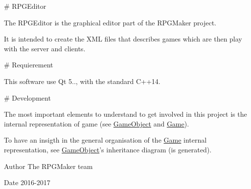 \# \-R\-P\-G\-Editor

\-The \-R\-P\-G\-Editor is the graphical editor part of the \-R\-P\-G\-Maker project.

\-It is intended to create the \-X\-M\-L files that describes games which are then play with the server and clients.

\# \-Requierement

\-This software use \-Qt 5.., with the standard \-C++14.

\# \-Development

\-The most important elements to understand to get involved in this project is the internal representation of game (see \hyperlink{class_game_object}{\-Game\-Object} and \hyperlink{class_game}{\-Game}).

\-To have an insigth in the general organisation of the \hyperlink{class_game}{\-Game} internal representation, see \hyperlink{class_game_object}{\-Game\-Object}'s inheritance diagram (is generated).

\begin{DoxyAuthor}{\-Author}
\-The \-R\-P\-G\-Maker team 
\end{DoxyAuthor}
\begin{DoxyDate}{\-Date}
2016-\/2017 
\end{DoxyDate}
